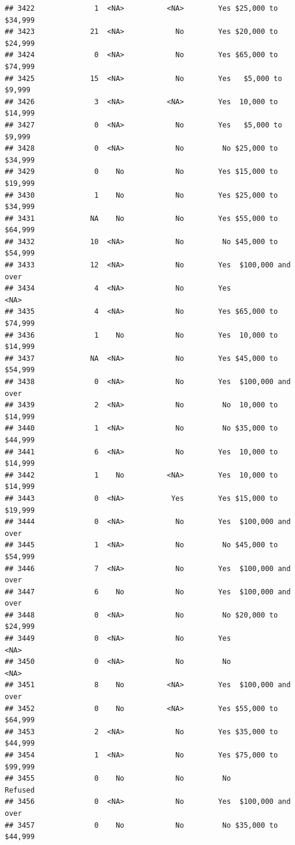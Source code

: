 \documentclass[man]{apa6}
\begin{document}
\begin{verbatim}
## 3422              1  <NA>          <NA>        Yes $25,000 to $34,999
## 3423             21  <NA>            No        Yes $20,000 to $24,999
## 3424              0  <NA>            No        Yes $65,000 to $74,999
## 3425             15  <NA>            No        Yes   $5,000 to $9,999
## 3426              3  <NA>          <NA>        Yes  10,000 to $14,999
## 3427              0  <NA>            No        Yes   $5,000 to $9,999
## 3428              0  <NA>            No         No $25,000 to $34,999
## 3429              0    No            No        Yes $15,000 to $19,999
## 3430              1    No            No        Yes $25,000 to $34,999
## 3431             NA    No            No        Yes $55,000 to $64,999
## 3432             10  <NA>            No         No $45,000 to $54,999
## 3433             12  <NA>            No        Yes  $100,000 and over
## 3434              4  <NA>            No        Yes               <NA>
## 3435              4  <NA>            No        Yes $65,000 to $74,999
## 3436              1    No            No        Yes  10,000 to $14,999
## 3437             NA  <NA>            No        Yes $45,000 to $54,999
## 3438              0  <NA>            No        Yes  $100,000 and over
## 3439              2  <NA>            No         No  10,000 to $14,999
## 3440              1  <NA>            No         No $35,000 to $44,999
## 3441              6  <NA>            No        Yes  10,000 to $14,999
## 3442              1    No          <NA>        Yes  10,000 to $14,999
## 3443              0  <NA>           Yes        Yes $15,000 to $19,999
## 3444              0  <NA>            No        Yes  $100,000 and over
## 3445              1  <NA>            No         No $45,000 to $54,999
## 3446              7  <NA>            No        Yes  $100,000 and over
## 3447              6    No            No        Yes  $100,000 and over
## 3448              0  <NA>            No         No $20,000 to $24,999
## 3449              0  <NA>            No        Yes               <NA>
## 3450              0  <NA>            No         No               <NA>
## 3451              8    No          <NA>        Yes  $100,000 and over
## 3452              0    No          <NA>        Yes $55,000 to $64,999
## 3453              2  <NA>            No        Yes $35,000 to $44,999
## 3454              1  <NA>            No        Yes $75,000 to $99,999
## 3455              0    No            No         No            Refused
## 3456              0  <NA>            No        Yes  $100,000 and over
## 3457              0    No            No         No $35,000 to $44,999

\end{verbatim}
\end{document}

